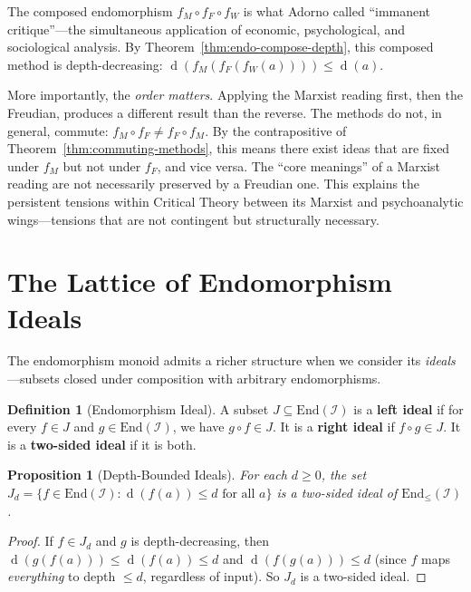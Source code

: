 \documentclass[11pt,openany]{book}
\theoremstyle{definition}
\newtheorem{definition}[axiom]{Definition}
\theoremstyle{plain}
\newtheorem{proposition}[axiom]{Proposition}
\theoremstyle{remark}
\newcommand{\IS}{\mathcal{I}}               %
\newcommand{\depth}{\operatorname{d}}       %
\begin{document}
The composed endomorphism $f_M \circ f_F \circ f_W$ is what Adorno called ``immanent critique''---the simultaneous application of economic, psychological, and sociological analysis. By Theorem~\ref{thm:endo-compose-depth}, this composed method is depth-decreasing: $\depth(f_M(f_F(f_W(a)))) \leq \depth(a)$.

More importantly, the \emph{order matters}. Applying the Marxist reading first, then the Freudian, produces a different result than the reverse. The methods do not, in general, commute: $f_M \circ f_F \neq f_F \circ f_M$. By the contrapositive of Theorem~\ref{thm:commuting-methods}, this means there exist ideas that are fixed under $f_M$ but not under $f_F$, and vice versa. The ``core meanings'' of a Marxist reading are not necessarily preserved by a Freudian one. This explains the persistent tensions within Critical Theory between its Marxist and psychoanalytic wings---tensions that are not contingent but structurally necessary.

\section{The Lattice of Endomorphism Ideals}

The endomorphism monoid admits a richer structure when we consider its \emph{ideals}---subsets closed under composition with arbitrary endomorphisms.

\begin{definition}[Endomorphism Ideal]
A subset $J \subseteq \mathrm{End}(\IS)$ is a \textbf{left ideal} if for every $f \in J$ and $g \in \mathrm{End}(\IS)$, we have $g \circ f \in J$. It is a \textbf{right ideal} if $f \circ g \in J$. It is a \textbf{two-sided ideal} if it is both.
\end{definition}

\begin{proposition}[Depth-Bounded Ideals]
For each $d \geq 0$, the set $J_d = \{f \in \mathrm{End}(\IS) : \depth(f(a)) \leq d \text{ for all } a\}$ is a two-sided ideal of $\mathrm{End}_{\leq}(\IS)$.
\end{proposition}

\begin{proof}
If $f \in J_d$ and $g$ is depth-decreasing, then $\depth(g(f(a))) \leq \depth(f(a)) \leq d$ and $\depth(f(g(a))) \leq d$ (since $f$ maps \emph{everything} to depth $\leq d$, regardless of input). So $J_d$ is a two-sided ideal.
\end{proof}
\end{document}
